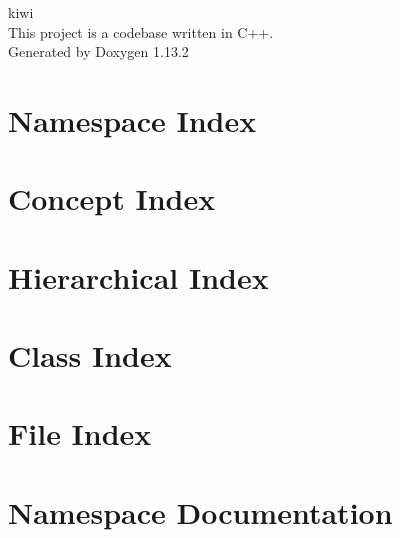 \documentclass[twoside]{book}
\newcommand{\+}{\discretionary{\mbox{\scriptsize$\hookleftarrow$}}{}{}}
\newcommand{\clearemptydoublepage}{%
    \newpage{\pagestyle{empty}\cleardoublepage}%
  }
\begin{document}
  \raggedbottom
    \hypersetup{pageanchor=false,
                bookmarksnumbered=true,
                pdfencoding=unicode
               }
  \begin{titlepage}
  \vspace*{7cm}
  \begin{center}%
  {\Large kiwi}\\
  [1ex]\large This project is a codebase written in C++. \\
  \vspace*{1cm}
  {\large Generated by Doxygen 1.13.2}\\
  \end{center}
  \end{titlepage}
  \clearemptydoublepage
  \tableofcontents
  \clearemptydoublepage
  \hypersetup{pageanchor=true}
\chapter{Namespace Index}

\chapter{Concept Index}

\chapter{Hierarchical Index}

\chapter{Class Index}

\chapter{File Index}

\chapter{Namespace Documentation}


\end{document}
